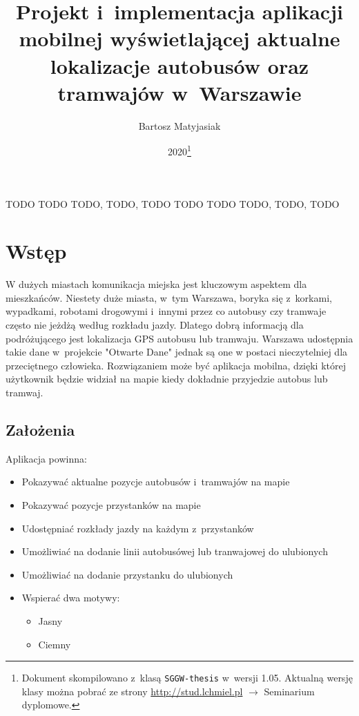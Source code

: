 \documentclass{SGGW-thesis}
\title{Projekt i~implementacja aplikacji mobilnej wyświetlającej aktualne lokalizacje autobusów oraz tramwajów w~Warszawie}
\author{Bartosz Matyjasiak}
\date{2020\footnote{Dokument skompilowano z~klasą {\tt SGGW-thesis} w~wersji 1.05. Aktualną wersję klasy można pobrać ze strony \url{http://stud.lchmiel.pl} $\rightarrow$ Seminarium dyplomowe.}}
\begin{document}
\maketitle
\statementpage
\abstractpage
{TODO}
{TODO}
{TODO, TODO, TODO}
{TODO}
{TODO}
{TODO, TODO, TODO}


{
  \doublespacing
  \tableofcontents
}

\startchapterfromoddpage %


\chapter{Wstęp}
W dużych miastach komunikacja miejska jest kluczowym aspektem dla mieszkańców.
Niestety duże miasta, w~tym Warszawa, boryka się z~korkami, wypadkami, robotami drogowymi i~innymi przez
co autobusy czy tramwaje często nie jeżdżą według rozkładu jazdy.
Dlatego dobrą informacją dla podróżującego jest lokalizacja GPS autobusu lub tramwaju.
Warszawa udostępnia takie dane w~projekcie "Otwarte Dane" jednak są one w postaci nieczytelniej dla przeciętnego człowieka.
Rozwiązaniem może być aplikacja mobilna, dzięki której użytkownik będzie widział na mapie kiedy dokładnie przyjedzie autobus lub tramwaj.
\section{Założenia}
Aplikacja powinna:
\label{ZALOZENIA}
\begin{itemize}
  \item{Pokazywać aktualne pozycje autobusów i~tramwajów na mapie}
  \item{Pokazywać pozycje przystanków na mapie}
  \item{Udostępniać rozkłady jazdy na każdym z~przystanków}
  \item{Umożliwiać na dodanie linii autobusówej lub tranwajowej do ulubionych}
  \item{Umożliwiać na dodanie przystanku do ulubionych}
  \item{Wspierać dwa motywy:}
  \begin{itemize}
    \item{Jasny}
    \item{Ciemny}
  \end{itemize}
\end{itemize}
\vfill
\pagebreak
\end{document}
